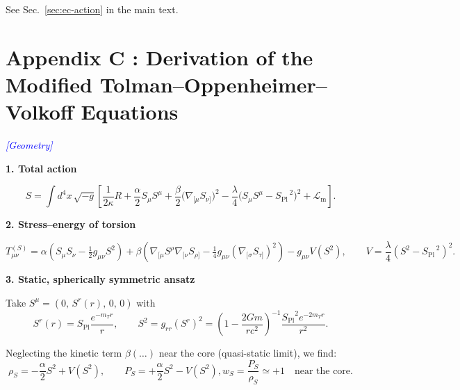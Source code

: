 \documentclass{article}
\newcommand{\Splanck}{\ensuremath{S_{\mathrm{Pl}}}}
\newcommand{\geometrytag}{\textcolor{blue}{\textit{[Geometry]}}}
\begin{document}
See Sec.~\ref{sec:ec-action} in the main text.









\section*{Appendix C : Derivation of the Modified Tolman--Oppenheimer--Volkoff Equations}
\label{app:tov-derivation}
\geometrytag


\textbf{1. Total action}

\begin{equation}\label{eq:auto180}
S = \int d^{4}x\,\sqrt{-g} \left[
 \frac{1}{2\kappa} R
 + \frac{\alpha}{2} S_\mu S^\mu
 + \frac{\beta}{2} \bigl(\nabla_{[\mu} S_{\nu]}\bigr)^2
 - \frac{\lambda}{4}\bigl(S_\mu S^\mu - \Splanck^{\,2} \bigr)^2
 + \mathcal{L}_{\mathrm{m}}
\right].
\end{equation}

\textbf{2. Stress--energy of torsion}

\begin{equation}\label{eq:auto181}
T^{(S)}_{\mu\nu} =
 \alpha \left(S_\mu S_\nu - \tfrac{1}{2} g_{\mu\nu} S^{2} \right)
 + \beta \left( \nabla_{[\mu} S^{\rho} \nabla_{[\nu} S_{\rho]}
 - \tfrac{1}{4} g_{\mu\nu} (\nabla_{[\sigma} S_{\tau]})^{2} \right)
 - g_{\mu\nu} V(S^{2}),
\qquad
V = \frac{\lambda}{4}(S^{2} - \Splanck^{\,2})^{2}.
\end{equation}

\textbf{3. Static, spherically symmetric ansatz}

Take $S^\mu = (0,\, S^r(r),\, 0,\, 0)$ with
\begin{equation}\label{eq:auto182}
S^r(r) = \Splanck \frac{e^{-m_T r}}{r}, \qquad
S^{2} = g_{rr} (S^r)^2 = \left(1 - \frac{2Gm}{rc^2}\right)^{-1} \frac{\Splanck^2 e^{-2m_T r}}{r^2}.
\end{equation}

Neglecting the kinetic term $\beta(\dots)$ near the core (quasi-static limit), we find:
\begin{equation}\label{eq:auto183}
\rho_S = -\frac{\alpha}{2} S^2 + V(S^2), \qquad P_S = +\frac{\alpha}{2} S^2 - V(S^2),       
w_S = \frac{P_S}{\rho_S} \simeq +1 \quad \text{near the core}.
\end{equation}
\end{document}
